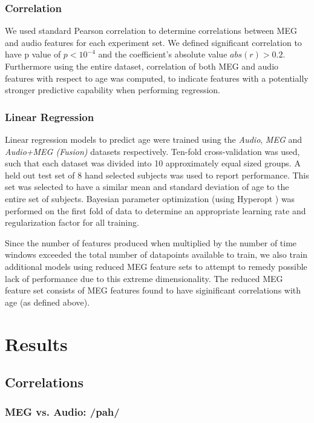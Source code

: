 \documentclass[a4paper]{article}
\begin{document}
\subsubsection{Correlation}

We used standard Pearson correlation to determine correlations between MEG and audio features for each experiment set. We defined significant correlation to have p value of $p < 10^{-4}$ and the coefficient's absolute value $abs(r) > 0.2$.  Furthermore using the entire dataset, correlation of both MEG and audio features with respect to age was computed, to indicate features with a potentially stronger predictive capability when performing regression.

\subsubsection{Linear Regression}

Linear regression models to predict age were trained using the \textit{Audio}, \textit{MEG} and \textit{Audio+MEG (Fusion)} datasets respectively. Ten-fold cross-validation was used, such that each dataset was divided into 10 approximately equal sized groups. A held out test set of 8 hand selected subjects was used to report performance. This set was selected to have a similar mean and standard deviation of age to the entire set of subjects. Bayesian parameter optimization (using Hyperopt \cite{Bergstra2013}) was performed on the first fold of data to determine an appropriate learning rate and regularization factor for all training.

Since the number of features produced when multiplied by the number of time windows exceeded the total number of datapoints available to train, we also train additional models using reduced MEG feature sets to attempt to remedy possible lack of performance due to this extreme dimensionality. The reduced MEG feature set consists of MEG features found to have siginificant correlations with age (as defined above).

\section{Results}

\subsection{Correlations}

\subsubsection{MEG vs. Audio: /pah/}
\end{document}
